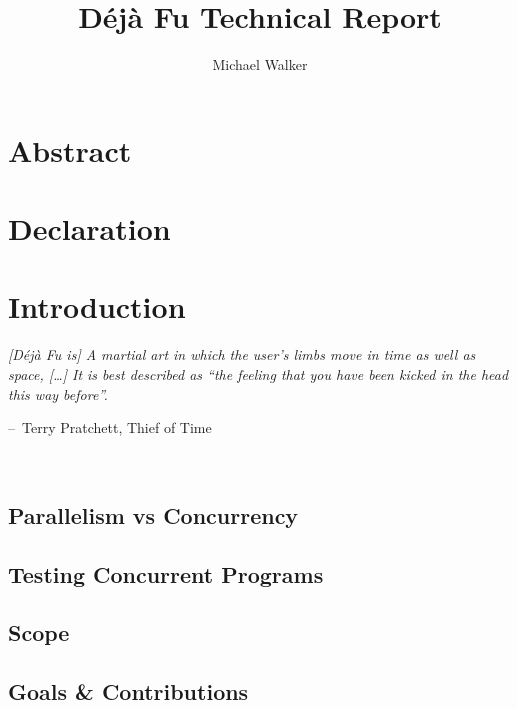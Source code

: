 \documentclass[openright, dottedtoc, headinclude, footinclude=true, a4paper, numbers=noenddot]{scrreprt}
\title{D\'{e}j\`{a} Fu Technical Report}
\author{Michael Walker}
\makeatletter
\newcommand{\frontmatter}{\cleardoublepage\pagenumbering{roman}}
\newcommand{\mainmatter}{\cleardoublepage\pagenumbering{arabic}}
\newenvironment{chapquote}[2][2em]
  {\setlength{\@tempdima}{#1}%
   \def\chapquote@author{#2}%
   \parshape 1 \@tempdima \dimexpr\textwidth-2\@tempdima\relax%
   \itshape}
  {\par\normalfont\hfill--\
    \chapquote@author\hspace*{\@tempdima}\par\noindent\hrulefill\\[1cm]}
\newcommand{\dejafu}{D\'{e}j\`{a} Fu}
\makeatother
\begin{document}
\frontmatter



\cleardoublepage

\chapter*{Abstract}


\tableofcontents


\chapter*{Declaration}


\mainmatter

\chapter{Introduction}
\label{chap:intro}
\begin{chapquote}{Terry Pratchett, Thief of Time\nocite{pratchett2001}}
  [\dejafu{} is] A martial art in which the user's limbs move in time
  as well as space, [\ldots] It is best described as ``the feeling
  that you have been kicked in the head this way before''.
\end{chapquote}



  \section{Parallelism vs Concurrency}
  \label{sec:intro-parconc}
  

  \section{Testing Concurrent Programs}
  \label{sec:intro-testing}
  

  \section{Scope}
  \label{sec:intro-scope}
  

  \section{Goals \& Contributions}
  \label{sec:intro-contribs}
  
\end{document}
